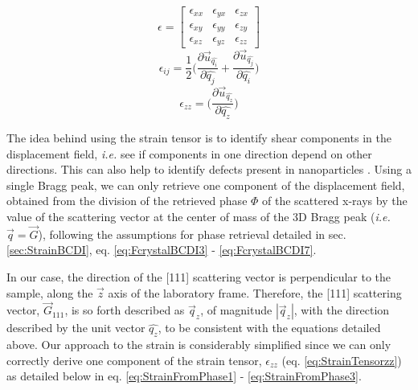 \begin{multicols}{3}
    \begin{equation}
        \epsilon =
        \begin{bmatrix}
            \epsilon_{xx} & \epsilon_{yx} & \epsilon_{zx}\\
            \epsilon_{xy} & \epsilon_{yy} & \epsilon_{zy}\\
            \epsilon_{xz} & \epsilon_{yz} & \epsilon_{zz}
        \end{bmatrix}
        \label{eq:StrainTensor}
    \end{equation}
    \break
    \begin{equation}
      \epsilon_{ij} = \frac{1}{2}
        \Bigg(
        \frac{\partial \vec{u}_{\hat{q_i}}}{\partial \hat{q_j}}
        +
        \frac{\partial \vec{u}_{\hat{q_j}}}{\partial \hat{q_i}}
        \Bigg)
        \label{eq:StrainTensorIJ}
    \end{equation}
    \break
    \begin{equation}
      \epsilon_{zz} =
        \Bigg(
        \frac{\partial \vec{u}_{\hat{q_z}}}{\partial \hat{q_z}}
        \Bigg)
        \label{eq:StrainTensorzz}
    \end{equation}
\end{multicols}

The idea behind using the strain tensor is to identify shear components in the displacement field, \textit{i.e.} see if components in one direction depend on other directions.
This can also help to identify defects present in nanoparticles \parencite{Lauraux2021}.
Using a single Bragg peak, we can only retrieve one component of the displacement field, obtained from the division of the retrieved phase $\Phi$ of the scattered x-rays by the value of the scattering vector at the center of mass of the 3D Bragg peak (\textit{i.e.} $\vec{q} = \vec{G}$), following the assumptions for phase retrieval detailed in sec. \ref{sec:StrainBCDI}, eq. \ref{eq:FcrystalBCDI3} - \ref{eq:FcrystalBCDI7}.

In our case, the direction of the [111] scattering vector is perpendicular to the sample, along the $\vec{z}$ axis of the laboratory frame.
Therefore, the [111] scattering vector, $\vec{G}_{111}$, is so forth described as $\vec{q}_z$, of magnitude  $|\vec{q}_z|$, with the direction described by the unit vector  $\hat{q_z}$, to be consistent with the equations detailed above.
Our approach to the strain is considerably simplified since we can only correctly derive one component of the strain tensor, $\epsilon_{zz}$ (eq. \ref{eq:StrainTensorzz}) as detailed below in eq. \ref{eq:StrainFromPhase1} - \ref{eq:StrainFromPhase3}.

